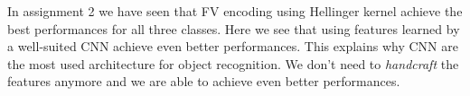\documentclass{article}
\begin{document}
In assignment 2 we have seen that FV encoding using Hellinger kernel achieve the best performances for all three classes. Here we see that using features learned by a well-suited CNN achieve even better performances. This explains why CNN are the most used architecture for object recognition. We don't need to \textsl{handcraft} the features anymore and we are able to achieve even better performances.
\end{document}
